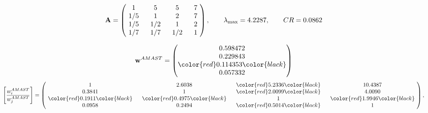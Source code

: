 \begin{example}
\begin{equation*}
\mathbf{A} =
\begin{pmatrix}
$\,\,$ 1 $\,\,$ & $\,\,$5$\,\,$ & $\,\,$5$\,\,$ & $\,\,$7 $\,\,$ \\
$\,\,$ 1/5$\,\,$ & $\,\,$ 1 $\,\,$ & $\,\,$2$\,\,$ & $\,\,$7 $\,\,$ \\
$\,\,$ 1/5$\,\,$ & $\,\,$ 1/2$\,\,$ & $\,\,$ 1 $\,\,$ & $\,\,$2 $\,\,$ \\
$\,\,$ 1/7$\,\,$ & $\,\,$ 1/7$\,\,$ & $\,\,$ 1/2$\,\,$ & $\,\,$ 1  $\,\,$ \\
\end{pmatrix},
\qquad
\lambda_{\max} =
4.2287,
\qquad
CR = 0.0862
\end{equation*}

\begin{equation*}
\mathbf{w}^{AMAST} =
\begin{pmatrix}
0.598472\\
0.229843\\
\color{red} 0.114353\color{black} \\
0.057332
\end{pmatrix}\end{equation*}
\begin{equation*}
\left[ \frac{{w}^{AMAST}_i}{{w}^{AMAST}_j} \right] =
\begin{pmatrix}
$\,\,$ 1 $\,\,$ & $\,\,$2.6038$\,\,$ & $\,\,$\color{red} 5.2336\color{black} $\,\,$ & $\,\,$10.4387$\,\,$ \\
$\,\,$0.3841$\,\,$ & $\,\,$ 1 $\,\,$ & $\,\,$\color{red} 2.0099\color{black} $\,\,$ & $\,\,$4.0090  $\,\,$ \\
$\,\,$\color{red} 0.1911\color{black} $\,\,$ & $\,\,$\color{red} 0.4975\color{black} $\,\,$ & $\,\,$ 1 $\,\,$ & $\,\,$\color{red} 1.9946\color{black}  $\,\,$ \\
$\,\,$0.0958$\,\,$ & $\,\,$0.2494$\,\,$ & $\,\,$\color{red} 0.5014\color{black} $\,\,$ & $\,\,$ 1  $\,\,$ \\
\end{pmatrix},
\end{equation*}


\end{example}
